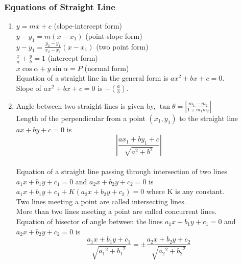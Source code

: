 \documentclass{article}
\begin{document}
\subsubsection*{Equations of Straight Line}
\begin{enumerate}
\item $y=mx+c$ (slope-intercept form)
\\$y-y_{1}=m(x-x_{1})$ (point-slope form)
\\ $y-y_{1}=\frac{y_{2}-y_{1}}{x_{2}-x_{1}}(x-x_{1})$ (two point form)
\\ $\frac{x}{a}+\frac{y}{b}=1$ (intercept form)
\\ $x \cos\alpha +y \sin\alpha = P$ (normal form)
\\ Equation of a straight line in the general form is $ax^{2}+bx+c=0$.
\\ Slope of $ax^{2}+bx+c=0$ is $-(\frac{a}{b})$.
\item Angle between two straight lines is given by, $\tan\theta=|\frac{m_{1}-m_{2}}{1+m_{1}m_{2}}|$
\\Length of the perpendicular from a point $(x_{1},y_{1})$ to the straight line $ax+by+c=0$ is
\[
|\frac{ax_{1}+by_{1}+c}{\sqrt{a^{2}+b^{2}}}|
\]
\\Equation of a straight line passing through intersection of two lines $a_{1}x+b_{1}y+c_{1}=0$ and $a_{2}x+b_{2}y+c_{2}=0$ is $a_{1}x+b_{1}y+c_{1}+K(a_{2}x+b_{2}y+c_{2})=0$ where K is any constant.
\\Two lines meeting a point are called intersecting lines.
\\More than two lines meeting a point are called concurrent lines.
\\Equation of bisector of angle between the lines $a_{1}x+b_{1}y+c_{1}=0$ and $a_{2}x+b_{2}y+c_{2}=0$ is
\[
\frac{a_{1}x+b_{1}y+c_{1}}{\sqrt{{a_{1}}^{2}+{b_{1}}^{2}}}=\pm\frac{a_{2}x+b_{2}y+c_{2}}{\sqrt{{a_{2}}^{2}+{b_{2}}^{2}}}
\]

\end{enumerate}
\end{document}
